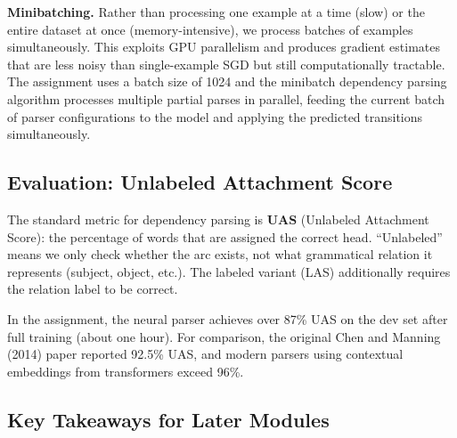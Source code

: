 \documentclass[11pt]{article}
\begin{document}
\textbf{Minibatching.} Rather than processing one example at a time (slow) or the entire dataset at once (memory-intensive), we process batches of examples simultaneously. This exploits GPU parallelism and produces gradient estimates that are less noisy than single-example SGD but still computationally tractable. The assignment uses a batch size of 1024 and the minibatch dependency parsing algorithm processes multiple partial parses in parallel, feeding the current batch of parser configurations to the model and applying the predicted transitions simultaneously.

\subsection{Evaluation: Unlabeled Attachment Score}

The standard metric for dependency parsing is \textbf{UAS} (Unlabeled Attachment Score): the percentage of words that are assigned the correct head. ``Unlabeled'' means we only check whether the arc exists, not what grammatical relation it represents (subject, object, etc.). The labeled variant (LAS) additionally requires the relation label to be correct.

In the assignment, the neural parser achieves over 87\% UAS on the dev set after full training (about one hour). For comparison, the original Chen and Manning (2014) paper reported 92.5\% UAS, and modern parsers using contextual embeddings from transformers exceed 96\%.

\subsection{Key Takeaways for Later Modules}
\end{document}
